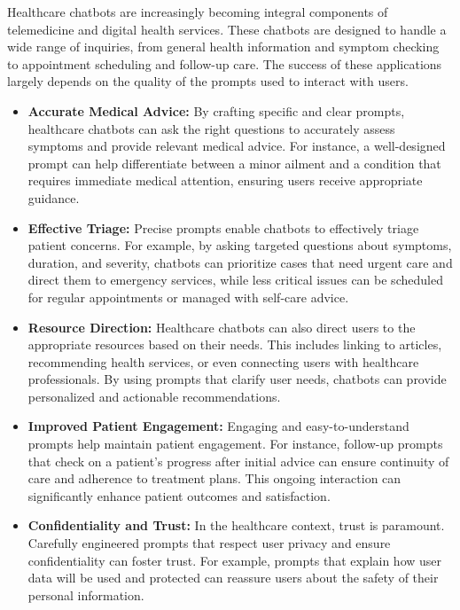 Healthcare chatbots are increasingly becoming integral components of telemedicine and digital health services. These chatbots are designed to handle a wide range of inquiries, from general health information and symptom checking to appointment scheduling and follow-up care. The success of these applications largely depends on the quality of the prompts used to interact with users.

\begin{itemize}
    \item \textbf{Accurate Medical Advice:} By crafting specific and clear prompts, healthcare chatbots can ask the right questions to accurately assess symptoms and provide relevant medical advice. For instance, a well-designed prompt can help differentiate between a minor ailment and a condition that requires immediate medical attention, ensuring users receive appropriate guidance.

    \item \textbf{Effective Triage:} Precise prompts enable chatbots to effectively triage patient concerns. For example, by asking targeted questions about symptoms, duration, and severity, chatbots can prioritize cases that need urgent care and direct them to emergency services, while less critical issues can be scheduled for regular appointments or managed with self-care advice.

    \item \textbf{Resource Direction:} Healthcare chatbots can also direct users to the appropriate resources based on their needs. This includes linking to articles, recommending health services, or even connecting users with healthcare professionals. By using prompts that clarify user needs, chatbots can provide personalized and actionable recommendations.

    \item \textbf{Improved Patient Engagement:} Engaging and easy-to-understand prompts help maintain patient engagement. For instance, follow-up prompts that check on a patient's progress after initial advice can ensure continuity of care and adherence to treatment plans. This ongoing interaction can significantly enhance patient outcomes and satisfaction.

    \item \textbf{Confidentiality and Trust:} In the healthcare context, trust is paramount. Carefully engineered prompts that respect user privacy and ensure confidentiality can foster trust. For example, prompts that explain how user data will be used and protected can reassure users about the safety of their personal information.


\end{itemize}
